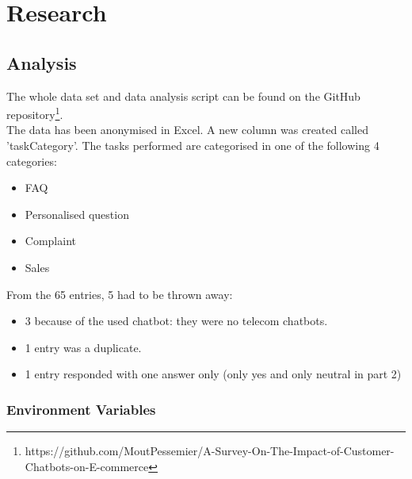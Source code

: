 \mainmatter
\pagestyle{headings}
\chapter{Research}
\label{ch:research}

\section{Analysis}
The whole data set and data analysis script can be found on the GitHub repository\footnote{https://github.com/MoutPessemier/A-Survey-On-The-Impact-of-Customer-Chatbots-on-E-commerce}.\\
\break
The data has been anonymised in Excel. A new column was created called 'taskCategory'. The tasks performed are categorised in one of the following 4 categories:
\begin{itemize}
	\item FAQ
	\item Personalised question
	\item Complaint
	\item Sales
\end{itemize}
From the 65 entries, 5 had to be thrown away:
\begin{itemize}
	\item 3 because of the used chatbot: they were no telecom chatbots.
	\item 1 entry was a duplicate.
	\item 1 entry responded with one answer only (only yes and only neutral in part 2)
\end{itemize}

\subsection{Environment Variables}
